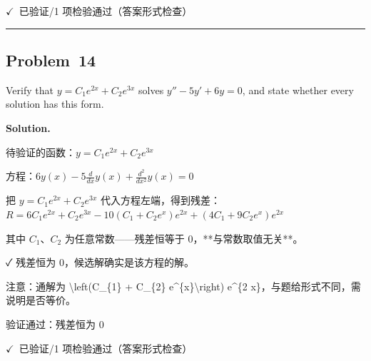 \documentclass[12pt, a4paper]{article}
\newcommand{\problem}[1]{\subsection*{Problem~#1}}
\newcommand{\solution}{%
  \par\noindent
  {\color{solutiongreen}\bfseries Solution.}\par
}
\newcommand{\verifyok}{\textcolor{solutiongreen}{\ensuremath{\checkmark}\ 已验证}}
\begin{document}
\begin{verifybox}\small \verifyok{}/1 项检验通过（答案形式检查） \end{verifybox}

\vspace{0.8em}\hrule\vspace{0.8em}

\problem{14}

\begin{stepbox}
Verify that $y = C_1 e^{2x} + C_2 e^{3x}$ solves $y'' - 5y' + 6y = 0$,
and state whether every solution has this form.
\end{stepbox}

\solution

\begin{stepbox}
待验证的函数：$y = C_{1} e^{2 x} + C_{2} e^{3 x}$
\end{stepbox}

\begin{stepbox}
方程：$6 y{\left(x \right)} - 5 \frac{d}{d x} y{\left(x \right)} + \frac{d^{2}}{d x^{2}} y{\left(x \right)} = 0$
\end{stepbox}

\begin{stepbox}
把 $y = C_{1} e^{2 x} + C_{2} e^{3 x}$ 代入方程左端，得到残差：$R = 6 C_{1} e^{2 x} + C_{2} e^{3 x} - 10 \left(C_{1} + C_{2} e^{x}\right) e^{2 x} + \left(4 C_{1} + 9 C_{2} e^{x}\right) e^{2 x}$
\end{stepbox}

\begin{stepbox}
其中 $C_{1}$、$C_{2}$ 为任意常数——残差恒等于 0，**与常数取值无关**。
\end{stepbox}

\begin{stepbox}
✓ 残差恒为 0，候选解确实是该方程的解。
\end{stepbox}

\begin{stepbox}
注意：通解为 \textbackslash{}left(C\_\{1\} + C\_\{2\} e\textasciicircum{}\{x\}\textbackslash{}right) e\textasciicircum{}\{2 x\}，与题给形式不同，需说明是否等价。
\end{stepbox}

\begin{center}
验证通过：残差恒为 0
\end{center}

\begin{verifybox}\small \verifyok{}/1 项检验通过（答案形式检查） \end{verifybox}
\end{document}
